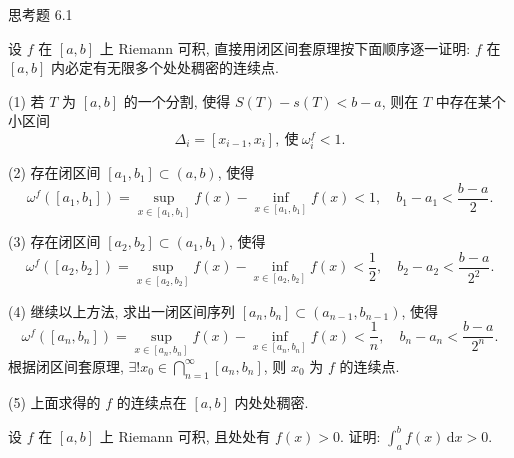 \begin{exblock}{思考题 6.1}
  \item 设 $f$ 在 $[a,b]$ 上 Riemann 可积, 直接用闭区间套原理按下面顺序逐一证明: $f$ 在 $[a,b]$ 内必定有无限多个处处稠密的连续点.

  (1) 若 $T$ 为 $[a,b]$ 的一个分割, 使得 $S(T)-s(T)<b-a$, 则在 $T$ 中存在某个小区间
  \[
  \Delta_{i}=[x_{i-1},x_{i}],\ \text{使}\ \omega_{i}^{f}<1.
\]

  (2) 存在闭区间 $[a_{1},b_{1}]\subset(a,b)$, 使得
  \[
  \omega^{f}([a_{1},b_{1}])=\sup_{x\in[a_{1},b_{1}]}f(x)-\inf_{x\in[a_{1},b_{1}]}f(x)<1,\quad b_{1}-a_{1}<\frac{b-a}{2}.
\]

  (3) 存在闭区间 $[a_{2},b_{2}]\subset(a_{1},b_{1})$, 使得
  \[
  \omega^{f}([a_{2},b_{2}])=\sup_{x\in[a_{2},b_{2}]}f(x)-\inf_{x\in[a_{2},b_{2}]}f(x)<\frac{1}{2},\quad b_{2}-a_{2}<\frac{b-a}{2^{2}}.
\]

  (4) 继续以上方法, 求出一闭区间序列 $[a_{n},b_{n}]\subset(a_{n-1},b_{n-1})$, 使得
  \[
  \omega^{f}([a_{n},b_{n}])=\sup_{x\in[a_{n},b_{n}]}f(x)-\inf_{x\in[a_{n},b_{n}]}f(x)<\frac{1}{n},\quad b_{n}-a_{n}<\frac{b-a}{2^{n}}.
\]
  根据闭区间套原理, $\exists!x_{0}\in\bigcap\limits_{n=1}^{\infty}[a_{n},b_{n}]$, 则 $x_{0}$ 为 $f$ 的连续点.

  (5) 上面求得的 $f$ 的连续点在 $[a,b]$ 内处处稠密.

  \item 设 $f$ 在 $[a,b]$ 上 Riemann 可积, 且处处有 $f(x)>0$. 证明: $\int_{a}^{b}f(x)\,\mathrm{d}x>0$.
\end{exblock}
